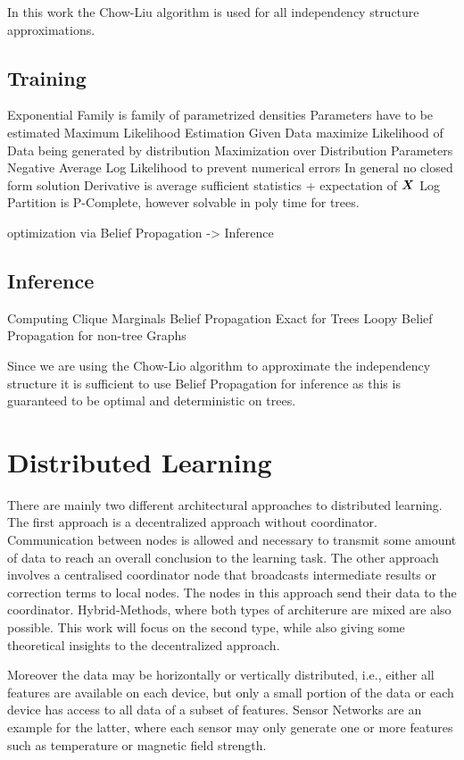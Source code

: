     In this work the Chow-Liu algorithm is used for all independency structure approximations.
\subsection{Training}
\label{ssec:train}

Exponential Family is family of parametrized densities
Parameters have to be estimated
Maximum Likelihood Estimation
Given Data maximize Likelihood of Data being generated by distribution
Maximization over Distribution Parameters 
Negative Average Log Likelihood to prevent numerical errors
In general no closed form solution
Derivative is average sufficient statistics + expectation of $\boldsymbol{X}$
Log Partition is P-Complete, however solvable in poly time for trees.

optimization via Belief Propagation -> Inference
\subsection{Inference}
\label{ssec:inf}

Computing Clique Marginals
Belief Propagation
Exact for Trees 
Loopy Belief Propagation for non-tree Graphs

Since we are using the Chow-Lio algorithm to approximate the independency structure it is sufficient to use Belief Propagation for inference as this is guaranteed to be optimal and deterministic on trees.

\section{Distributed Learning}
There are mainly two different architectural approaches to distributed learning. 
The first approach is a decentralized approach without coordinator.
Communication between nodes is allowed and necessary to transmit some amount of data to reach an overall conclusion to the learning task.
The other approach involves a centralised coordinator node that broadcasts intermediate results or correction terms to local nodes.
The nodes in this approach send their data to the coordinator. 
Hybrid-Methods, where both types of architerure are mixed are also possible.
This work will focus on the second type, while also giving some theoretical insights to the decentralized approach.

Moreover the data may be horizontally or vertically distributed, i.e., either all features are available on each device, but only a small portion of the data or each device has access to all data of a subset of features.
Sensor Networks are an example for the latter, where each sensor may only generate one or more features such as temperature or magnetic field strength.

